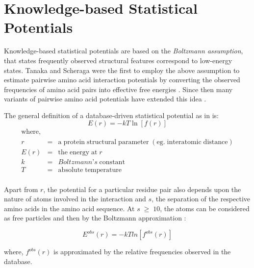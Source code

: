 \section{Knowledge-based Statistical Potentials}
Knowledge-based statistical potentials are based on the \textit{Boltzmann assumption}, that states frequently observed structural features correspond to low-energy states. Tanaka and Scheraga were the first to employ the above assumption to estimate pairwise amino acid interaction potentials by converting the observed frequencies of amino acid pairs into effective free energies \citep{Tanaka1976}. Since then many variants of pairwise amino acid potentials have extended this idea \citep{Miyazawa1996, Sippl1993}.

The general definition of a database-driven statistical potential as in \citep{Sippl1990} is:
\begin{equation}
E(r) = -kT\ln[f(r)]
\end{equation}
\begin{eqnarray}
\mathrm{where,} \nonumber \\
r &=& \mathrm{a\;protein\;structural\;parameter\;(eg.\;interatomic\;distance)} \nonumber \\
E(r) &=& \mathrm{the\;energy\;at\;}r \nonumber \\
k &=& \mathrm{\textit{Boltzmann's}\;constant} \nonumber \\
T &=& \mathrm{absolute\;temperature} \nonumber \\
\nonumber
\end{eqnarray}

Apart from $r$, the potential for a particular residue pair also depends upon the nature of atoms involved in the interaction and $s$, the separation of the respective amino acids in the amino acid sequence. At $s\;\geq\;10$, the atoms can be considered as free particles and then by the Boltzmann approximation :

\begin{equation}
E^{obs}(r) = -kTln[f^{obs}(r)]
\end{equation}

where, $f^{obs}(r)$ is approximated by the relative frequencies observed in the database.

